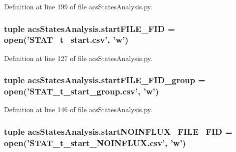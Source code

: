 Definition at line 199 of file acs\-States\-Analysis.\-py.

\hypertarget{a00098_a0239a9dcc4900463a0c19557bec23521}{
\subsubsection[{start\-F\-I\-L\-E\-\_\-\-F\-I\-D}]{\setlength{\rightskip}{0pt plus 5cm}tuple acs\-States\-Analysis.\-start\-F\-I\-L\-E\-\_\-\-F\-I\-D = open('S\-T\-A\-T\-\_\-t\-\_\-start.\-csv', 'w')}}\label{a00098_a0239a9dcc4900463a0c19557bec23521}


Definition at line 127 of file acs\-States\-Analysis.\-py.

\hypertarget{a00098_addede16e21598cc53c446efa66bd20d9}{
\subsubsection[{start\-F\-I\-L\-E\-\_\-\-F\-I\-D\-\_\-group}]{\setlength{\rightskip}{0pt plus 5cm}tuple acs\-States\-Analysis.\-start\-F\-I\-L\-E\-\_\-\-F\-I\-D\-\_\-group = open('S\-T\-A\-T\-\_\-t\-\_\-start\-\_\-group.\-csv', 'w')}}\label{a00098_addede16e21598cc53c446efa66bd20d9}


Definition at line 146 of file acs\-States\-Analysis.\-py.

\hypertarget{a00098_a44f4f158af9771fbabbbacc4f4484d32}{
\subsubsection[{start\-N\-O\-I\-N\-F\-L\-U\-X\-\_\-\-F\-I\-L\-E\-\_\-\-F\-I\-D}]{\setlength{\rightskip}{0pt plus 5cm}tuple acs\-States\-Analysis.\-start\-N\-O\-I\-N\-F\-L\-U\-X\-\_\-\-F\-I\-L\-E\-\_\-\-F\-I\-D = open('S\-T\-A\-T\-\_\-t\-\_\-start\-\_\-\-N\-O\-I\-N\-F\-L\-U\-X.\-csv', 'w')}}\label{a00098_a44f4f158af9771fbabbbacc4f4484d32}


